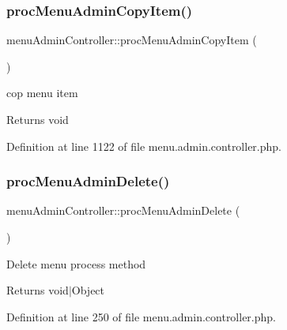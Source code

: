 \hypertarget{classmenuAdminController_a57e5d3ee6747a38fd87eae506238e17f}{}\label{classmenuAdminController_a57e5d3ee6747a38fd87eae506238e17f} 
\subsubsection{\texorpdfstring{proc\+Menu\+Admin\+Copy\+Item()}{procMenuAdminCopyItem()}}
{\footnotesize\ttfamily menu\+Admin\+Controller\+::proc\+Menu\+Admin\+Copy\+Item (\begin{DoxyParamCaption}{ }\end{DoxyParamCaption})}

cop menu item \begin{DoxyReturn}{Returns}
void 
\end{DoxyReturn}


Definition at line 1122 of file menu.\+admin.\+controller.\+php.

\hypertarget{classmenuAdminController_a04aa66dfff4235f9b2749d1b33cd5c1c}{}\label{classmenuAdminController_a04aa66dfff4235f9b2749d1b33cd5c1c} 
\subsubsection{\texorpdfstring{proc\+Menu\+Admin\+Delete()}{procMenuAdminDelete()}}
{\footnotesize\ttfamily menu\+Admin\+Controller\+::proc\+Menu\+Admin\+Delete (\begin{DoxyParamCaption}{ }\end{DoxyParamCaption})}

Delete menu process method \begin{DoxyReturn}{Returns}
void$\vert$\+Object 
\end{DoxyReturn}


Definition at line 250 of file menu.\+admin.\+controller.\+php.

\hypertarget{classmenuAdminController_a8af649b53b356cc3b359253acd2183a2}{}\label{classmenuAdminController_a8af649b53b356cc3b359253acd2183a2} 
